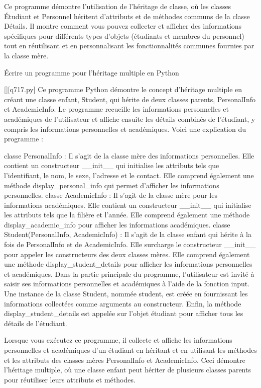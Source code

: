 \begin{solution}
Ce programme démontre l'utilisation de l'héritage de classe, où les classes Étudiant et Personnel héritent d'attributs et de méthodes communs de la classe Détails. Il montre comment vous pouvez collecter et afficher des informations spécifiques pour différents types d'objets (étudiants et membres du personnel) tout en réutilisant et en personnalisant les fonctionnalités communes fournies par la classe mère.
        \end{solution}
        

        \question
        Écrire un programme pour l'héritage multiple en Python
        \par
        \begin{solution}
            \renewcommand{\nomfichier}{q717.py}
            \pythonfile{\chemincode \nomfichier}[][\nomfichier]
            Ce programme Python démontre le concept d'héritage multiple en créant une classe enfant, Student, qui hérite de deux classes parents, PersonalInfo et AcademicInfo. Le programme recueille les informations personnelles et académiques de l'utilisateur et affiche ensuite les détails combinés de l'étudiant, y compris les informations personnelles et académiques. Voici une explication du programme :

    classe PersonalInfo : Il s'agit de la classe mère des informations personnelles. Elle contient un constructeur __init__ qui initialise les attributs tels que l'identifiant, le nom, le sexe, l'adresse et le contact. Elle comprend également une méthode display_personal_info qui permet d'afficher les informations personnelles.
    classe AcademicInfo : Il s'agit de la classe mère pour les informations académiques. Elle contient un constructeur __init__ qui initialise les attributs tels que la filière et l'année. Elle comprend également une méthode display_academic_info pour afficher les informations académiques.
    classe Student(PersonalInfo, AcademicInfo) : Il s'agit de la classe enfant qui hérite à la fois de PersonalInfo et de AcademicInfo. Elle surcharge le constructeur __init__ pour appeler les constructeurs des deux classes mères. Elle comprend également une méthode display_student_details pour afficher les informations personnelles et académiques.
    Dans la partie principale du programme, l'utilisateur est invité à saisir ses informations personnelles et académiques à l'aide de la fonction input.
    Une instance de la classe Student, nommée student, est créée en fournissant les informations collectées comme arguments au constructeur.
    Enfin, la méthode display_student_details est appelée sur l'objet étudiant pour afficher tous les détails de l'étudiant.

Lorsque vous exécutez ce programme, il collecte et affiche les informations personnelles et académiques d'un étudiant en héritant et en utilisant les méthodes et les attributs des classes mères PersonalInfo et AcademicInfo. Ceci démontre l'héritage multiple, où une classe enfant peut hériter de plusieurs classes parents pour réutiliser leurs attributs et méthodes.
        \end{solution}
        

